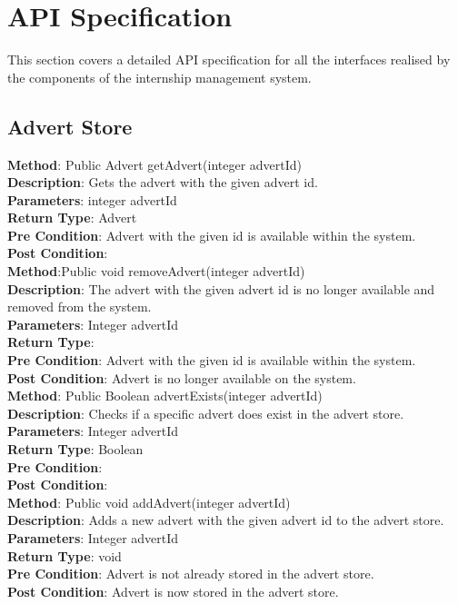 \documentclass{l3deliverable}
\begin{document}

\section{API Specification}

This section covers a detailed API specification for all the interfaces realised by the components of the internship management system.

\subsection{Advert Store}

\textbf{Method}: Public Advert getAdvert(integer advertId)\\
\textbf{Description}: Gets the advert with the given advert id.\\
\textbf{Parameters}: integer advertId\\
\textbf{Return Type}: Advert\\
\textbf{Pre Condition}: Advert with the given id is available within the system. \\
\textbf{Post Condition}: \\

\textbf{Method}:Public void removeAdvert(integer advertId)\\
\textbf{Description}: The advert with the given advert id is no longer available and removed from the system.\\
\textbf{Parameters}: Integer advertId\\
\textbf{Return Type}: \\
\textbf{Pre Condition}: Advert with the given id is available within the system.\\
\textbf{Post Condition}: Advert is no longer available on the system.\\

\textbf{Method}: Public Boolean advertExists(integer advertId)\\
\textbf{Description}: Checks if a specific advert does exist in the advert store.\\
\textbf{Parameters}: Integer advertId\\
\textbf{Return Type}: Boolean\\
\textbf{Pre Condition}:\\
\textbf{Post Condition}:\\

\textbf{Method}: Public void addAdvert(integer advertId)\\
\textbf{Description}: Adds a new advert with the given advert id to the advert store. \\
\textbf{Parameters}: Integer advertId\\
\textbf{Return Type}: void\\
\textbf{Pre Condition}: Advert is not already stored in the advert store.\\
\textbf{Post Condition}: Advert is now stored in the advert store.\\
\end{document}
